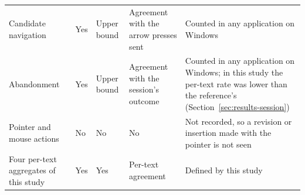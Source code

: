 {\begin{longtable}{L{0.18}L{0.17}L{0.17}L{0.18}L{0.30}}
Candidate navigation & Yes & Upper bound & Agreement with the arrow presses sent & Counted in any application on Windows \\
Abandonment & Yes & Upper bound & Agreement with the session's outcome & Counted in any application on Windows; in this
study the per-text rate was lower than the reference's (Section~\ref{sec:results-session}) \\
Pointer and mouse actions & No & No & No & Not recorded, so a revision or insertion made with the pointer is not seen \\
Four per-text aggregates of this study & Yes & Yes & Per-text agreement & Defined by this study \\
\bottomrule
\end{longtable}
}
